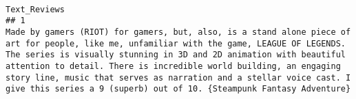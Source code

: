 \documentclass[
]{article}
\begin{document}
\begin{verbatim}
                                                                                                         Text_Reviews
## 1                                                                                                                                                                                                                                                                                                                                                                                                                                                                                                                                                                                                                                                                                                                                                                                                                                                                                                                                                                                                                                                                                                                                                                                                                                                                                                                                                                                                                                                                                                                                                                                                                                                                                                                                                                                                                                                                                                                                                                                                                                                                                                                                                                                                                                                                                                                                                                                                                                                                                                                                                                                                                             Made by gamers (RIOT) for gamers, but, also, is a stand alone piece of art for people, like me, unfamiliar with the game, LEAGUE OF LEGENDS. The series is visually stunning in 3D and 2D animation with beautiful attention to detail. There is incredible world building, an engaging story line, music that serves as narration and a stellar voice cast. I give this series a 9 (superb) out of 10. {Steampunk Fantasy Adventure}

\end{verbatim}
\end{document}
